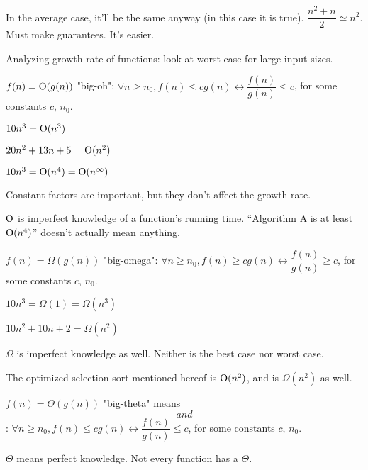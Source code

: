 In the average case, it'll be the same anyway (in this case it is true). $\dfrac{n^2 + n}{2} \simeq n^2$. Must make guarantees. It's easier.


Analyzing growth rate of functions: look at worst case for large input sizes.

\begin{defn}
$f(n) = {\rm O}(g(n))$ "big-oh": $\forall n \geq n_0, f(n) \leq cg(n) \leftrightarrow \dfrac{f(n)}{g(n)} \leq c$, for some constants $c$, $n_0$.
\end{defn}

\begin{ex}
$10n^3 = {\rm O}(n^3)$
\end{ex}

\begin{ex}
$20n^2 + 13n + 5 = {\rm O}(n^2)$
\end{ex}

\begin{ex}
$10n^3 = {\rm O}(n^4) = {\rm O}(n^\infty)$
\end{ex}

Constant factors are important, but they don't affect the growth rate.

${\rm O}$ is imperfect knowledge of a function's running time. ``Algorithm A is at least ${\rm O}(n^4)$'' doesn't actually mean anything.

\begin{defn}
$f(n) = \Omega (g(n))$ "big-omega": $\forall n \geq n_0, f(n) \geq cg(n) \leftrightarrow \dfrac{f(n)}{g(n)} \geq c$, for some constants $c$, $n_0$.
\end{defn}

\begin{ex}
$10n^3 = \Omega(1) = \Omega(n^3)$
\end{ex}

\begin{ex}
$10n^2 + 10n + 2 = \Omega(n^2)$
\end{ex}

$\Omega$ is imperfect knowledge as well. Neither is the best case nor worst case.

The optimized selection sort mentioned hereof is ${\rm O}(n^2)$, and is $\Omega(n^2)$ as well.

\begin{defn}
$f(n) = \Theta(g(n))$ "big-theta" means $$ and $$: $\forall n \geq n_0, f(n) \leq cg(n) \leftrightarrow \dfrac{f(n)}{g(n)} \leq c$, for some constants $c$, $n_0$.
\end{defn}

$\Theta$ means perfect knowledge. Not every function has a $\Theta$.
